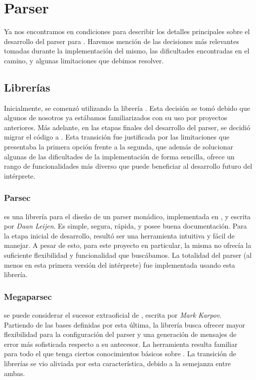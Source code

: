 \section{Parser}

Ya nos encontramos en condiciones para describir los detalles principales sobre el desarrollo del parser para \Lenguaje{}.
Haremos mención de las decisiones más relevantes tomadas durante la implementación del mismo, las dificultades encontradas en el camino, y algunas limitaciones que debimos resolver.

\subsection{Librerías}

Inicialmente, se comenzó utilizando la librería \Parsec{} \parencite{Parsec}.
Esta decisión se tomó debido que algunos de nosotros ya estábamos familiarizados con su uso por proyectos anteriores.
Más adelante, en las etapas finales del desarrollo del parser, se decidió migrar el código a \Megaparsec{} \parencite{Megaparsec}.
Esta transición fue justificada por las limitaciones que presentaba la primera opción frente a la segunda, que además de solucionar algunas de las dificultades de la implementación de forma sencilla, ofrece un rango de funcionalidades más diverso que puede beneficiar al desarrollo futuro del intérprete.

\subsubsection{Parsec}

\Parsec{} es una librería para el diseño de un parser monádico, implementada en \Haskell{}, y escrita por \textit{Daan Leijen}.
Es simple, segura, rápida, y posee buena documentación.
Para la etapa inicial de desarrollo, resultó ser una herramienta intuitiva y fácil de manejar.
A pesar de esto, para este proyecto en particular, la misma no ofrecía la suficiente flexibilidad y funcionalidad que buscábamos.
La totalidad del parser (al menos en esta primera versión del intérprete) fue implementada usando esta librería.

\subsubsection{Megaparsec}

\Megaparsec{} se puede considerar el sucesor extraoficial de \Parsec{}, escrita por \textit{Mark Karpov}.
Partiendo de las bases definidas por esta última, la librería busca ofrecer mayor flexibilidad para la configuración del parser y una generación de mensajes de error más sofisticada respecto a su antecesor.
La herramienta resulta familiar para todo el que tenga ciertos conocimientos básicos sobre \Parsec{}.
La transición de librerías se vio aliviada por esta característica, debido a la semejanza entre ambas.

